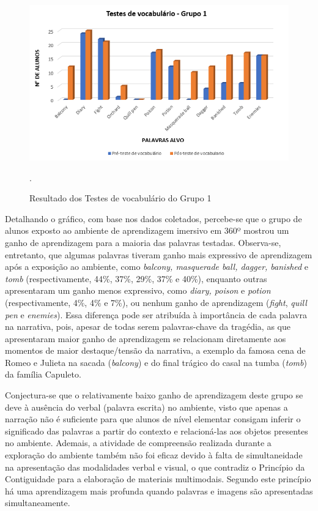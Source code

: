 \begin{figure}[htpb]
    \centering
    \begin{minipage}{.75\textwidth}
    \includegraphics[width=\textwidth]{graph-01.png}
    \caption{Resultado dos Testes de vocabulário do Grupo 1}.
    \label{graph-01}
    \end{minipage}
\end{figure}

Detalhando o gráfico, com base nos dados coletados, percebe-se que o
grupo de alunos exposto ao ambiente de aprendizagem imersivo em 360º
mostrou um ganho de aprendizagem para a maioria das palavras testadas.
Observa-se, entretanto, que algumas palavras tiveram ganho mais
expressivo de aprendizagem após a exposição ao ambiente, como
\emph{balcony, masquerade ball, dagger, banished} e \emph{tomb}
(respectivamente, 44\%, 37\%, 29\%, 37\% e 40\%), enquanto outras
apresentaram um ganho menos expressivo, como \emph{diary, poison} e
\emph{potion} (respectivamente, 4\%, 4\% e 7\%), ou nenhum ganho de
aprendizagem (\emph{fight}, \emph{quill pen} e \emph{enemies}). Essa
diferença pode ser atribuída à importância de cada palavra na narrativa,
pois, apesar de todas serem palavras-chave da tragédia, as que
apresentaram maior ganho de aprendizagem se relacionam diretamente aos
momentos de maior destaque/tensão da narrativa, a exemplo da famosa cena
de Romeo e Julieta na sacada (\emph{balcony}) e do final trágico do
casal na tumba (\emph{tomb}) da família Capuleto.

Conjectura-se que o relativamente baixo ganho de aprendizagem deste
grupo se deve à ausência do verbal (palavra escrita) no ambiente, visto
que apenas a narração não é suficiente para que alunos de nível
elementar consigam inferir o significado das palavras a partir do
contexto e relacioná-las aos objetos presentes no ambiente. Ademais, a
atividade de compreensão realizada durante a exploração do ambiente
também não foi eficaz devido à falta de simultaneidade na apresentação
das modalidades verbal e visual, o que contradiz o Princípio da
Contiguidade \cite{mayer2002} para a elaboração de materiais multimodais.
Segundo este princípio há uma aprendizagem mais profunda quando palavras
e imagens são apresentadas simultaneamente.

